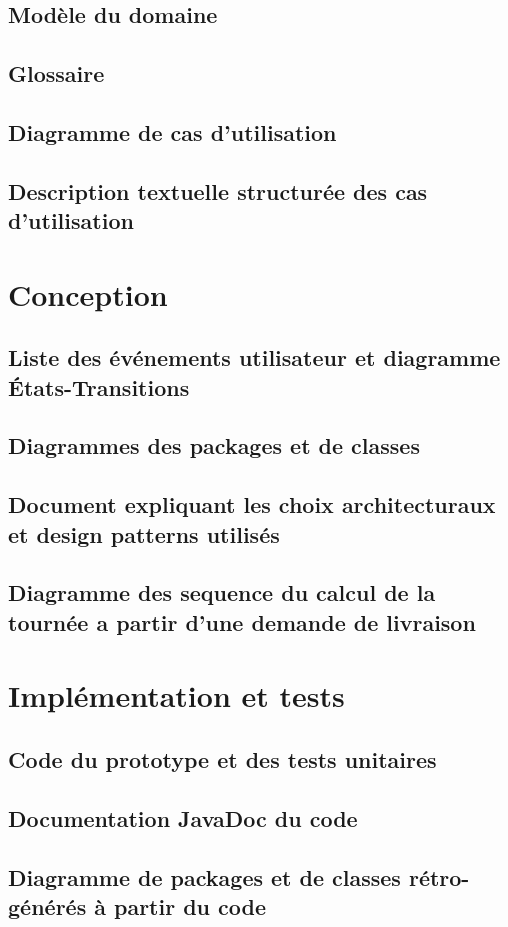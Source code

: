 \documentclass[10pt,a4paper]{book}
\begin{document}
\section{Modèle du domaine}
\section{Glossaire}
\section{Diagramme de cas d'utilisation}
\section{Description textuelle structurée des cas d'utilisation}
\chapter{Conception}
\section{Liste des événements utilisateur et diagramme États-Transitions}
\section{Diagrammes des packages et de classes}
\section{Document expliquant les choix architecturaux et design patterns utilisés}
\section{Diagramme des sequence du calcul de la tournée a partir d'une demande de livraison}
\chapter{Implémentation et tests}
\section{Code du prototype et des tests unitaires}
\section{Documentation JavaDoc du code}
\section{Diagramme de packages et de classes rétro-générés à partir du code}
\end{document}
